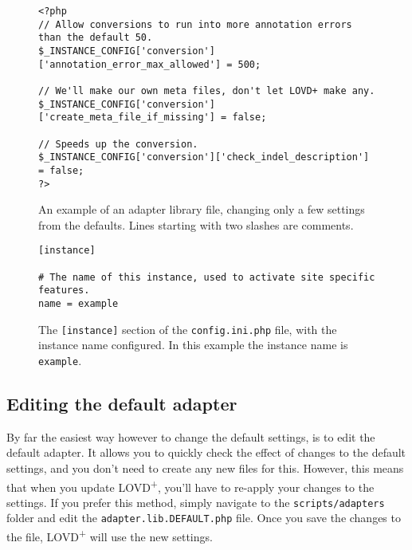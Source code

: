 \begin{figure}[ht]
  \begin{shaded}
    \small
    \begin{verbatim}
<?php
// Allow conversions to run into more annotation errors than the default 50.
$_INSTANCE_CONFIG['conversion']['annotation_error_max_allowed'] = 500;

// We'll make our own meta files, don't let LOVD+ make any.
$_INSTANCE_CONFIG['conversion']['create_meta_file_if_missing'] = false;

// Speeds up the conversion.
$_INSTANCE_CONFIG['conversion']['check_indel_description'] = false;
?>
\end{verbatim}
  \caption{%
    An example of an adapter library file, changing only a few settings from the defaults.
    Lines starting with two slashes are comments.}
    \label{fig:adapters_new_file}
  \end{shaded}
\end{figure}

\begin{figure}[ht]
  \begin{shaded}
    \small
    \begin{verbatim}
[instance]

# The name of this instance, used to activate site specific features.
name = example
\end{verbatim}
  \caption{%
    The \texttt{[instance]} section of the \texttt{config.ini.php} file, with the instance name configured.
    In this example the instance name is \texttt{example}.}
    \label{fig:adapters_instance_name}
  \end{shaded}
\end{figure}



\subsection{Editing the default adapter}
\label{ssec:adapters_editing_the_default}
By far the easiest way however to change the default settings, is to edit the default adapter.
It allows you to quickly check the effect of changes to the default settings,
 and you don't need to create any new files for this.
However, this means that when you update LOVD\textsuperscript{+}, you'll have to re-apply your changes to the settings.
If you prefer this method, simply navigate to the \texttt{scripts/adapters}
 folder and edit the \texttt{adapter.lib.DEFAULT.php} file.
Once you save the changes to the file, LOVD\textsuperscript{+} will use the new settings.



